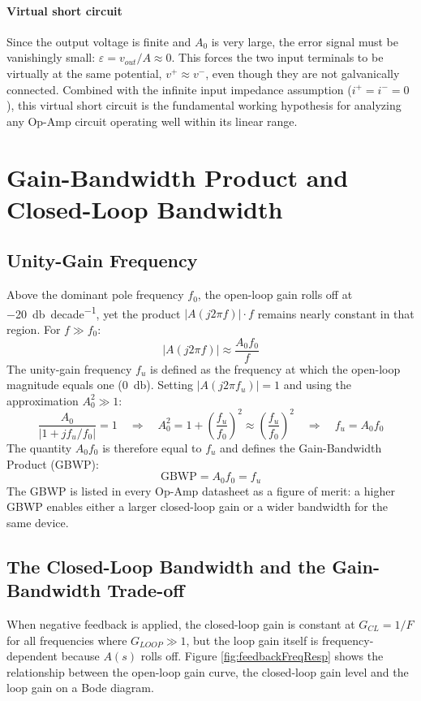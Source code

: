 \paragraph{Virtual short circuit} Since the output voltage is finite and \( A_0 \) is very large, the error signal must be vanishingly small: \( \varepsilon = v_{out}/A \approx 0 \). This forces the two input terminals to be virtually at the same potential, \( v^{+} \approx v^{-} \), even though they are not galvanically connected. Combined with the infinite input impedance assumption (\( i^{+} = i^{-} = 0 \)), this virtual short circuit is the fundamental working hypothesis for analyzing any Op-Amp circuit operating well within its linear range.

\section{Gain-Bandwidth Product and Closed-Loop Bandwidth}
\label{sc:28}

\subsection{Unity-Gain Frequency}

Above the dominant pole frequency \( f_0 \), the open-loop gain rolls off at \SI{-20}{\decibel\per decade}, yet the product \( |A(j2\pi f)|\cdot f \) remains nearly constant in that region. For \( f \gg f_0 \):
\[
|A(j2\pi f)| \approx \frac{A_0 f_0}{f}
\]
The unity-gain frequency \( f_u \) is defined as the frequency at which the open-loop magnitude equals one (\SI{0}{\decibel}). Setting \( |A(j2\pi f_u)| = 1 \) and using the approximation \( A_0^2 \gg 1 \):
\[
\frac{A_0}{|1 + j f_u/f_0|} = 1
\quad\Longrightarrow\quad
A_0^2 = 1 + \left(\frac{f_u}{f_0}\right)^2 \approx \left(\frac{f_u}{f_0}\right)^2
\quad\Longrightarrow\quad
f_u = A_0 f_0
\]
The quantity \( A_0 f_0 \) is therefore equal to \( f_u \) and defines the Gain-Bandwidth Product (GBWP):
\[
\mathrm{GBWP} = A_0 f_0 = f_u
\]
The GBWP is listed in every Op-Amp datasheet as a figure of merit: a higher GBWP enables either a larger closed-loop gain or a wider bandwidth for the same device.

\subsection{The Closed-Loop Bandwidth and the Gain-Bandwidth Trade-off}

When negative feedback is applied, the closed-loop gain is constant at \( G_{CL} = 1/F \) for all frequencies where \( G_{LOOP} \gg 1 \), but the loop gain itself is frequency-dependent because \( A(s) \) rolls off. Figure \ref{fig:feedbackFreqResp} shows the relationship between the open-loop gain curve, the closed-loop gain level and the loop gain on a Bode diagram.

